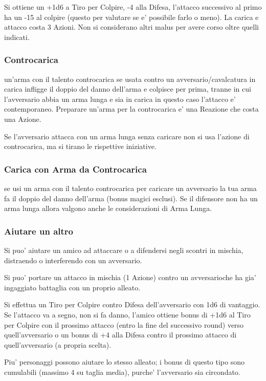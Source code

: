 \documentclass[a4paper,11pt,twoside,openany]{book}
\begin{document}
	Si ottiene un +1d6 a Tiro per Colpire, -4 alla Difesa, l'attacco successivo al primo ha un -15 al colpire (questo per valutare se e' possibile farlo o meno). La carica e attacco costa 3 Azioni. Non si considerano altri malus per avere corso oltre quelli indicati.
	
	\subsubsection{Controcarica} un'arma con il talento controcarica se usata contro un avversario/cavalcatura in carica infligge il doppio del danno dell'arma e colpisce per prima, tranne in cui l'avversario abbia un arma lunga e sia in carica in questo caso l'attacco e' contemporaneo. Preparare un'arma per la controcarica e' una Reazione che costa una Azione.
	
	Se l'avversario attacca con un arma lunga senza caricare non si usa
	l'azione di controcarica, ma si tirano le rispettive iniziative.
	
	\subsubsection{Carica con Arma da Controcarica} se usi un arma con il talento controcarica per caricare un avversario la tua arma fa il doppio del danno dell'arma (bonus magici esclusi). Se il difensore non ha un arma lunga allora valgono anche le considerazioni di Arma Lunga.
	
	\subsubsection{Aiutare un altro} Si puo' aiutare un amico ad attaccare o a difendersi negli scontri in mischia, distraendo o interferendo con un avversario.
	
	Si puo' portare un attacco in mischia (1 Azione) contro un avversarioche ha gia' ingaggiato battaglia con un proprio alleato.
	
	Si effettua un Tiro per Colpire contro Difesa dell'avversario con 1d6 di vantaggio. Se l'attacco va a segno, non si fa danno, l'amico ottiene bonus di +1d6 al Tiro per Colpire con il prossimo attacco (entro la fine del successivo round) verso quell'avversario o un bonus di +4 alla Difesa contro il prossimo attacco di quell'avversario (a propria scelta). 
	
	Piu' personaggi possono aiutare lo stesso alleato; i bonus di questo tipo sono cumulabili (massimo 4 su taglia media), purche' l'avversario sia circondato.
	
\end{document}
